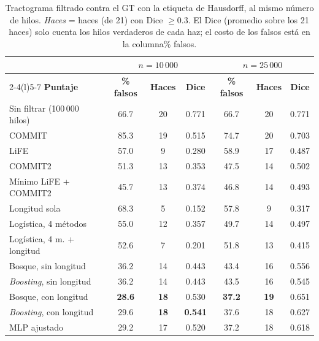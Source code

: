 \documentclass[11pt,a4paper]{article}
\begin{document}
\begin{table}[H]
\centering
\small
\begin{tabularx}{\textwidth}{@{}Xcccccc@{}}
\toprule
 & \multicolumn{3}{c}{$n=10\,000$} & \multicolumn{3}{c}{$n=25\,000$}\\
\cmidrule(lr){2-4}\cmidrule(l){5-7}
\textbf{Puntaje} & \textbf{\% falsos} & \textbf{Haces} & \textbf{Dice} & \textbf{\% falsos} & \textbf{Haces} & \textbf{Dice}\\
\midrule
Sin filtrar (100\,000 hilos)       & 66.7 & 20 & 0.771 & 66.7 & 20 & 0.771\\
COMMIT                             & 85.3 & 19 & 0.515 & 74.7 & 20 & 0.703\\
LiFE                               & 57.0 &  9 & 0.280 & 58.9 & 17 & 0.487\\
COMMIT2                            & 51.3 & 13 & 0.353 & 47.5 & 14 & 0.502\\
M\'inimo LiFE + COMMIT2            & 45.7 & 13 & 0.374 & 46.8 & 14 & 0.493\\
Longitud sola                      & 68.3 &  5 & 0.152 & 57.8 &  9 & 0.317\\
\addlinespace
Log\'istica, 4 m\'etodos & 55.0 & 12 & 0.357 & 49.7 & 14 & 0.497\\
Log\'istica, 4 m. + longitud & 52.6 &  7 & 0.201 & 51.8 & 13 & 0.415\\
Bosque, sin longitud               & 36.2 & 14 & 0.443 & 43.4 & 16 & 0.556\\
\textit{Boosting}, sin longitud    & 36.2 & 14 & 0.443 & 43.5 & 16 & 0.545\\
Bosque, con longitud               & \textbf{28.6} & \textbf{18} & 0.530 & \textbf{37.2} & \textbf{19} & 0.651\\
\textit{Boosting}, con longitud    & 29.6 & \textbf{18} & \textbf{0.541} & 37.6 & 18 & 0.627\\
MLP ajustado &29.2 &17 &0.520 & 37.2&18 &0.618 \\
\bottomrule
\end{tabularx}
\caption{Tractograma filtrado contra el GT con la etiqueta de Hausdorff, al mismo n\'umero de
hilos. \emph{Haces} = haces (de 21) con Dice $\ge0.3$. El Dice (promedio sobre los 21 haces) solo cuenta los hilos verdaderos de cada haz; el costo de los falsos est\'a en la columna\% falsos.}
\label{tab:modelos-haces}
\end{table}
\end{document}
